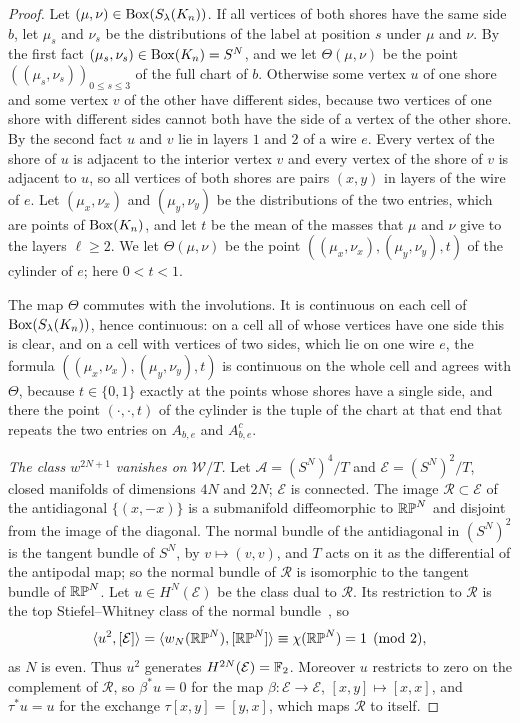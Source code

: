\begin{proof}
Let $(\mu,\nu)\in\operatorname{Box}(S_\lambda(K_n))$. If all vertices of both shores have the same side $b$, let $\mu_s$ and $\nu_s$ be the distributions of the label at position $s$ under $\mu$ and $\nu$. By the first fact $(\mu_s,\nu_s)\in\operatorname{Box}(K_n)=S^N$, and we let $\Theta(\mu,\nu)$ be the point $((\mu_s,\nu_s))_{0\le s\le3}$ of the full chart of $b$. Otherwise some vertex $u$ of one shore and some vertex $v$ of the other have different sides, because two vertices of one shore with different sides cannot both have the side of a vertex of the other shore. By the second fact $u$ and $v$ lie in layers $1$ and $2$ of a wire $e$. Every vertex of the shore of $u$ is adjacent to the interior vertex $v$ and every vertex of the shore of $v$ is adjacent to $u$, so all vertices of both shores are pairs $(x,y)$ in layers of the wire of $e$. Let $(\mu_x,\nu_x)$ and $(\mu_y,\nu_y)$ be the distributions of the two entries, which are points of $\operatorname{Box}(K_n)$, and let $t$ be the mean of the masses that $\mu$ and $\nu$ give to the layers $\ell\ge2$. We let $\Theta(\mu,\nu)$ be the point $((\mu_x,\nu_x),(\mu_y,\nu_y),t)$ of the cylinder of $e$; here $0<t<1$.

The map $\Theta$ commutes with the involutions. It is continuous on each cell of $\operatorname{Box}(S_\lambda(K_n))$, hence continuous: on a cell all of whose vertices have one side this is clear, and on a cell with vertices of two sides, which lie on one wire $e$, the formula $((\mu_x,\nu_x),(\mu_y,\nu_y),t)$ is continuous on the whole cell and agrees with $\Theta$, because $t\in\{0,1\}$ exactly at the points whose shores have a single side, and there the point $(\cdot,\cdot,t)$ of the cylinder is the tuple of the chart at that end that repeats the two entries on $A_{b,e}$ and $A_{b,e}^c$.

\emph{The class $w^{2N+1}$ vanishes on $\mathcal W/T$.} Let $\mathcal A=(S^N)^4/T$ and $\mathcal E=(S^N)^2/T$, closed manifolds of dimensions $4N$ and $2N$; $\mathcal E$ is connected. The image $\mathcal R\subset\mathcal E$ of the antidiagonal $\{(x,-x)\}$ is a submanifold diffeomorphic to $\mathbb{RP}^N$ and disjoint from the image of the diagonal. The normal bundle of the antidiagonal in $(S^N)^2$ is the tangent bundle of $S^N$, by $v\mapsto(v,v)$, and $T$ acts on it as the differential of the antipodal map; so the normal bundle of $\mathcal R$ is isomorphic to the tangent bundle of $\mathbb{RP}^N$. Let $u\in H^N(\mathcal E)$ be the class dual to $\mathcal R$. Its restriction to $\mathcal R$ is the top Stiefel--Whitney class of the normal bundle~\cite[\S11]{MS}, so
\[
 \langle u^2,[\mathcal E]\rangle=\langle w_N(\mathbb{RP}^N),[\mathbb{RP}^N]\rangle\equiv\chi(\mathbb{RP}^N)=1\pmod2 ,
\]
as $N$ is even. Thus $u^2$ generates $H^{2N}(\mathcal E)=\mathbb F_2$. Moreover $u$ restricts to zero on the complement of $\mathcal R$, so $\beta^*u=0$ for the map $\beta:\mathcal E\to\mathcal E$, $[x,y]\mapsto[x,x]$, and $\tau^*u=u$ for the exchange $\tau[x,y]=[y,x]$, which maps $\mathcal R$ to itself.


\end{proof}
